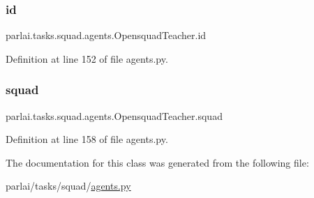 \subsubsection{\texorpdfstring{id}{id}}
{\footnotesize\ttfamily parlai.\+tasks.\+squad.\+agents.\+Opensquad\+Teacher.\+id}



Definition at line 152 of file agents.\+py.

\mbox{\label{classparlai_1_1tasks_1_1squad_1_1agents_1_1OpensquadTeacher_af69eaf825785fc1f53f34aa45e5b6c3f}} 
\subsubsection{\texorpdfstring{squad}{squad}}
{\footnotesize\ttfamily parlai.\+tasks.\+squad.\+agents.\+Opensquad\+Teacher.\+squad}



Definition at line 158 of file agents.\+py.



The documentation for this class was generated from the following file\+:\begin{DoxyCompactItemize}
\item 
parlai/tasks/squad/\hyperlink{parlai_2tasks_2squad_2agents_8py}{agents.\+py}\end{DoxyCompactItemize}
